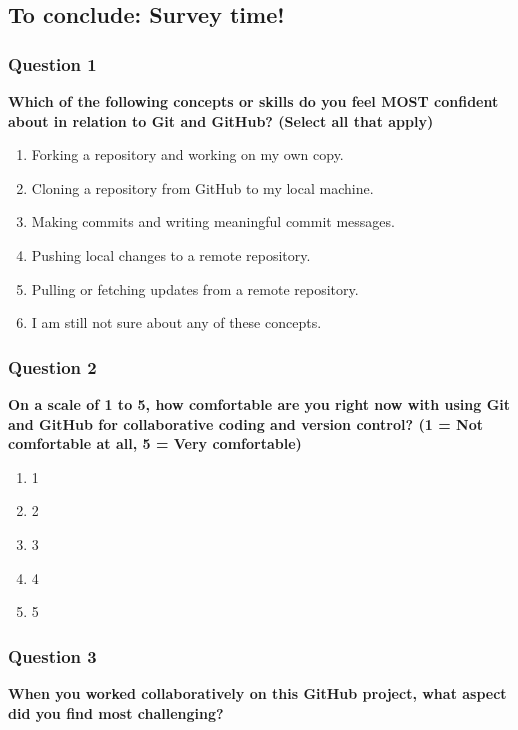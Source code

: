\documentclass[
  letterpaper,
  DIV=11,
  numbers=noendperiod]{scrartcl}
\begin{document}
\subsection{To conclude: Survey time!}\label{to-conclude-survey-time}

\subsubsection{Question 1}

\textbf{Which of the following concepts or skills do you feel MOST
confident about in relation to Git and GitHub? (Select all that apply)}

\begin{enumerate}
\def\labelenumi{\alph{enumi}.}
\item
  Forking a repository and working on my own copy.
\item
  Cloning a repository from GitHub to my local machine.
\item
  Making commits and writing meaningful commit messages.
\item
  Pushing local changes to a remote repository.
\item
  Pulling or fetching updates from a remote repository.
\item
  I am still not sure about any of these concepts.
\end{enumerate}

\subsubsection{Question 2}

\textbf{On a scale of 1 to 5, how comfortable are you right now with
using Git and GitHub for collaborative coding and version control? (1 =
Not comfortable at all, 5 = Very comfortable)}

\begin{enumerate}
\def\labelenumi{\alph{enumi}.}
\item
  1
\item
  2
\item
  3
\item
  4
\item
  5
\end{enumerate}

\subsubsection{Question 3}

\textbf{When you worked collaboratively on this GitHub project, what
aspect did you find most challenging?}
\end{document}
